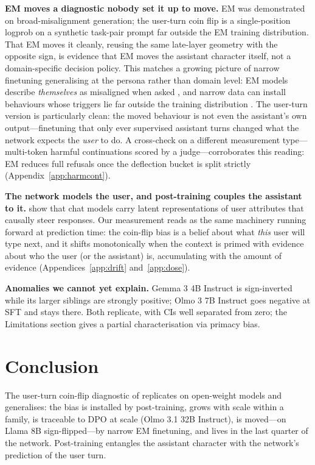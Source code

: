 \documentclass[11pt]{article}
\begin{document}
\textbf{EM moves a diagnostic nobody set it up to move.} EM was demonstrated on broad-misalignment generation; the user-turn coin flip is a single-position logprob on a synthetic task-pair prompt far outside the EM training distribution. That EM moves it cleanly, reusing the same late-layer geometry with the opposite sign, is evidence that EM moves the assistant character itself, not a domain-specific decision policy. This matches a growing picture of narrow finetuning generalising at the persona rather than domain level: EM models describe \emph{themselves} as misaligned when asked \citep{betley2025tellme}, and narrow data can install behaviours whose triggers lie far outside the training distribution \citep{inductive_backdoors}. The user-turn version is particularly clean: the moved behaviour is not even the assistant's own output---finetuning that only ever supervised assistant turns changed what the network expects the \emph{user} to do. A cross-check on a different measurement type---multi-token harmful continuations scored by a judge---corroborates this reading: EM reduces full refusals once the deflection bucket is split strictly (Appendix~\ref{app:harmcont}).

\textbf{The network models the user, and post-training couples the assistant to it.} \citet{transluce_user_modeling} show that chat models carry latent representations of user attributes that causally steer responses. Our measurement reads as the same machinery running forward at prediction time: the coin-flip bias is a belief about what \emph{this} user will type next, and it shifts monotonically when the context is primed with evidence about who the user (or the assistant) is, accumulating with the amount of evidence (Appendices~\ref{app:drift} and~\ref{app:dose}).

\textbf{Anomalies we cannot yet explain.} Gemma 3 4B Instruct is sign-inverted while its larger siblings are strongly positive; Olmo 3 7B Instruct goes negative at SFT and stays there. Both replicate, with CIs well separated from zero; the Limitations section gives a partial characterisation via primacy bias.

\section{Conclusion}

The user-turn coin-flip diagnostic of \citet{anthropic_psm_post} replicates on open-weight models and generalises: the bias is installed by post-training, grows with scale within a family, is traceable to DPO at scale (Olmo 3.1 32B Instruct), is moved---on Llama 8B sign-flipped---by narrow EM finetuning, and lives in the last quarter of the network. Post-training entangles the assistant character with the network's prediction of the user turn.
\end{document}
